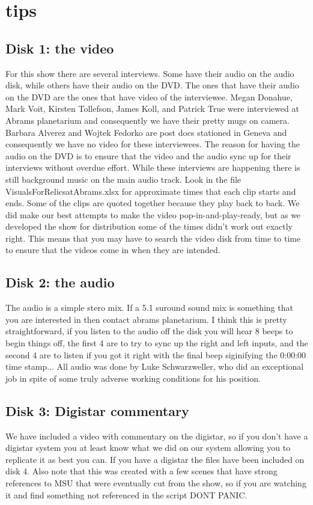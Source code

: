 \documentclass{article}
\begin{document}
\section{tips}
\subsection{Disk 1: the video}
For this show there are several interviews. Some have their audio on the audio disk, while others have their audio on the DVD. The ones that have their audio on the DVD are the ones that have video of the interviewee. Megan Donahue, Mark Voit, Kirsten Tollefson, James Koll, and Patrick True were interviewed at Abrams planetarium and consequently we have their pretty mugs on camera. Barbara Alverez and Wojtek Fedorko are post docs stationed in Geneva and consequently we have no video for these interviewees. The reason for having the audio on the DVD is to ensure that the video and the audio sync up for their interviews without overdue effort. While these interviews are happening there is still background music on the main audio track. Look in the file VisualsForRelicsatAbrams.xlsx for approximate times that each clip starts and ends. Some of the clips are quoted together because they play back to back. We did make our best attempts to make the video pop-in-and-play-ready, but as we developed the show for distribution some of the times didn't work out exactly right. This means that you may have to search the video disk from time to time to ensure that the videos come in when they are intended. 
\subsection{Disk 2: the audio}
The audio is a simple stero mix. If a 5.1 suround sound mix is something that you are interested in then contact abrams planetarium.  
I think this is pretty straightforward, if you listen to the audio off the disk you will hear 8 beeps to begin things off, the first 4 are to try to sync up the right and left inputs, and the second 4 are to listen if you got it right with the final beep siginifying the 0:00:00 time stamp... 
All audio was done by Luke Schwarzweller, who did an exceptional job in spite of some truly adverse working conditions for his position. 
\subsection{Disk 3: Digistar commentary} 
We have included a video with commentary on the digistar, so if you don't have a digistar system you at least know what we did on our system allowing you to replicate it as best you can. If you have a digistar the files have been included on disk 4. Also note that this was created with a few scenes that have strong references to MSU that were eventually cut from the show, so if you are watching it and find something not referenced in the script DONT PANIC. 
\end{document}
